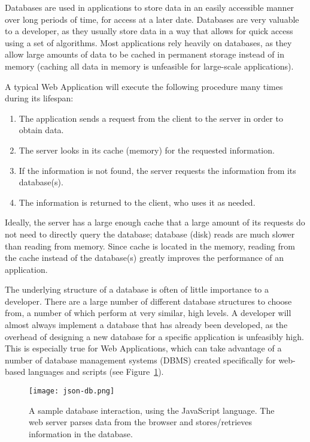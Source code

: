 \documentclass{acmsmall}
\begin{document}
Databases are used in applications to store data in an easily accessible manner over long periods of time, for access at a later date.  Databases are very valuable to a developer, as they usually store data in a way that allows for quick access using a set of algorithms.  Most applications rely heavily on databases, as they allow large amounts of data to be cached in permanent storage instead of in memory (caching all data in memory is unfeasible for large-scale applications).

A typical Web Application will execute the following procedure many times during its lifespan\cite{datacenters}:

\begin{enumerate}
\item The application sends a request from the client to the server in order to obtain data.
\item The server looks in its cache (memory) for the requested information.
\item If the information is not found, the server requests the information from its database(s).
\item The information is returned to the client, who uses it as needed.
\end{enumerate}

Ideally, the server has a large enough cache that a large amount of its requests do not need to directly query the database; database (disk) reads are much slower than reading from memory.  Since cache is located in the memory, reading from the cache instead of the database(s) greatly improves the performance of an application.

The underlying structure of a database is often of little importance to a developer.  There are a large number of different database structures to choose from, a number of which perform at very similar, high levels.  A developer will almost always implement a database that has already been developed, as the overhead of designing a new database for a specific application is unfeasibly high.  This is especially true for Web Applications, which can take advantage of a number of database management systems (DBMS) created specifically for web-based languages and scripts (see Figure~\ref{fig:jsdb}).

\begin{figure}[h]
\begin{center}
\texttt{[image: json-db.png]}
\caption{A sample database interaction, using the JavaScript language\cite{redora}.  The web server parses data from the browser and stores/retrieves information in the database.}
\end{center}
\label{fig:jsdb}
\end{figure}
\end{document}
